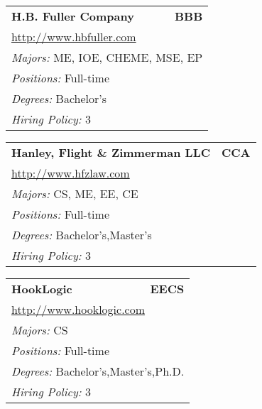 \documentclass[twoside]{article}
\begin{document}
\begin{center}
\begin{multicols}{3}
\begin{FlushLeft}
\begin{minipage}{\columnwidth}
\end{minipage}
 
\begin{minipage}{\columnwidth}\begin{tabularx}{.95\columnwidth}{Xr}
                 {\Large\bf H.B. Fuller Company} & {\Large\bf BBB}\\
    \multicolumn{2}{p{.95\columnwidth}}{\url{http://www.hbfuller.com}}\\
    \multicolumn{2}{p{.95\columnwidth}}{\emph{Majors:} ME, IOE, CHEME, MSE, EP}\\
    \multicolumn{2}{p{.95\columnwidth}}{\emph{Positions:} Full-time}\\
    \multicolumn{2}{p{.95\columnwidth}}{\emph{Degrees:} Bachelor's}\\
    \multicolumn{2}{p{.95\columnwidth}}{\emph{Hiring Policy:} 3}\\
    \end{tabularx}
    
\end{minipage}
 
\begin{minipage}{\columnwidth}\begin{tabularx}{.95\columnwidth}{Xr}
                 {\Large\bf Hanley, Flight \& Zimmerman LLC} & {\Large\bf CCA}\\
    \multicolumn{2}{p{.95\columnwidth}}{\url{http://www.hfzlaw.com}}\\
    \multicolumn{2}{p{.95\columnwidth}}{\emph{Majors:} CS, ME, EE, CE}\\
    \multicolumn{2}{p{.95\columnwidth}}{\emph{Positions:} Full-time}\\
    \multicolumn{2}{p{.95\columnwidth}}{\emph{Degrees:} Bachelor's,Master's}\\
    \multicolumn{2}{p{.95\columnwidth}}{\emph{Hiring Policy:} 3}\\
    \end{tabularx}
    
\end{minipage}
 
\begin{minipage}{\columnwidth}\begin{tabularx}{.95\columnwidth}{Xr}
                 {\Large\bf HookLogic} & {\Large\bf EECS}\\
    \multicolumn{2}{p{.95\columnwidth}}{\url{http://www.hooklogic.com}}\\
    \multicolumn{2}{p{.95\columnwidth}}{\emph{Majors:} CS}\\
    \multicolumn{2}{p{.95\columnwidth}}{\emph{Positions:} Full-time}\\
    \multicolumn{2}{p{.95\columnwidth}}{\emph{Degrees:} Bachelor's,Master's,Ph.D.}\\
    \multicolumn{2}{p{.95\columnwidth}}{\emph{Hiring Policy:} 3}\\
    \end{tabularx}
    

\end{minipage}
\end{FlushLeft}
\end{multicols}
\end{center}
\end{document}
